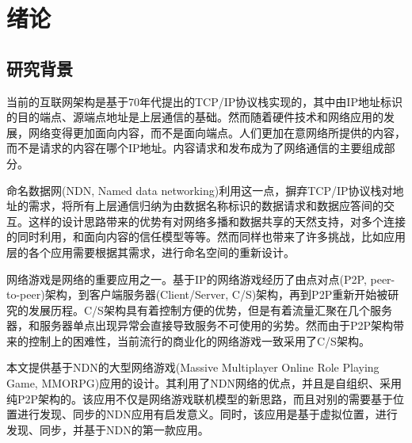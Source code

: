 % 
%
%
% 
%

\chapter{绪论}
\label{PrefaceChapter}

    
\section{研究背景}
\par
当前的互联网架构是基于70年代提出的TCP/IP协议栈实现的，其中由IP地址标识的目的端点、源端点地址是上层通信的基础。然而随着硬件技术和网络应用的发展，网络变得更加面向内容，而不是面向端点。人们更加在意网络所提供的内容，而不是请求的内容在哪个IP地址。内容请求和发布成为了网络通信的主要组成部分。
\par
命名数据网(NDN, Named data networking)利用这一点，摒弃TCP/IP协议栈对地址的需求，将所有上层通信归纳为由数据名称标识的数据请求和数据应答间的交互。这样的设计思路带来的优势有对网络多播和数据共享的天然支持，对多个连接的同时利用，和面向内容的信任模型等等。然而同样也带来了许多挑战，比如应用层的各个应用需要根据其需求，进行命名空间的重新设计。
\par
网络游戏是网络的重要应用之一。基于IP的网络游戏经历了由点对点(P2P, peer-to-peer)架构，到客户端服务器(Client/Server, C/S)架构，再到P2P重新开始被研究的发展历程。C/S架构具有着控制方便的优势，但是有着流量汇聚在几个服务器，和服务器单点出现异常会直接导致服务不可使用的劣势。然而由于P2P架构带来的控制上的困难性，当前流行的商业化的网络游戏一致采用了C/S架构。
\par
本文提供基于NDN的大型网络游戏(Massive Multiplayer Online Role Playing Game, MMORPG)应用的设计。其利用了NDN网络的优点，并且是自组织、采用纯P2P架构的。该应用不仅是网络游戏联机模型的新思路，而且对别的需要基于位置进行发现、同步的NDN应用有启发意义。同时，该应用是基于虚拟位置，进行发现、同步，并基于NDN的第一款应用。
